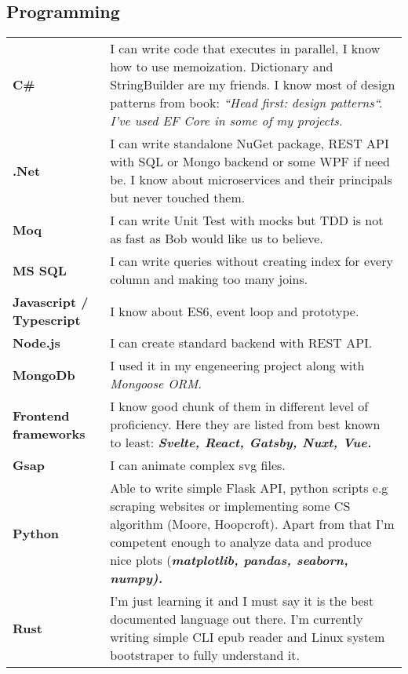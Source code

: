 \documentclass[10pt]{article}
\renewcommand{\arraystretch}{0}
\begin{document}
\subsection{Programming}
\renewcommand{\arraystretch}{2.5}
\begin{table}[H]
    \begin{tabularx}{\textwidth}{@{}l X}
         \textbf{C\#} & I can write code that executes in parallel, I know how to use memoization. Dictionary and StringBuilder are my friends. I know most of design patterns from book: \em ``Head first: design patterns``. I've used EF Core in some of my projects.\\
         \textbf{.Net} & I can write standalone NuGet package, REST API with SQL or Mongo backend or some WPF if need be. I know about microservices and their principals but never touched them. \\
         \textbf{Moq} & I can write Unit Test with mocks but TDD is not as fast as Bob would like us to believe.  \\
         \textbf{MS SQL} & I can write queries without creating index for every column and making too many joins. \\
	 \textbf{Javascript / Typescript} & I know about ES6, event loop and prototype.\\
	 \textbf{Node.js} & I can create standard backend with REST API.\\
         \textbf{MongoDb} & I used it in my engeneering project along with \emph{Mongoose ORM}. \\
         \textbf{Frontend frameworks} & I know good chunk of them in different level of proficiency. Here they are listed from best known to least: \bfseries \em Svelte, React, Gatsby, Nuxt, Vue. \\
         \textbf{Gsap} & I can animate complex svg files.\\
         \textbf{Python} & Able to write simple Flask API, python scripts e.g scraping websites or implementing some CS algorithm (Moore, Hoopcroft). Apart from that I'm competent enough to analyze data and produce nice plots (\bfseries \em matplotlib, pandas, seaborn, numpy). \\
         \textbf{Rust} & I'm just learning it and I must say it is the best documented language out there. I'm currently writing simple CLI epub reader and Linux system bootstraper to fully understand it. \\
    \end{tabularx}
\end{table}
\end{document}
